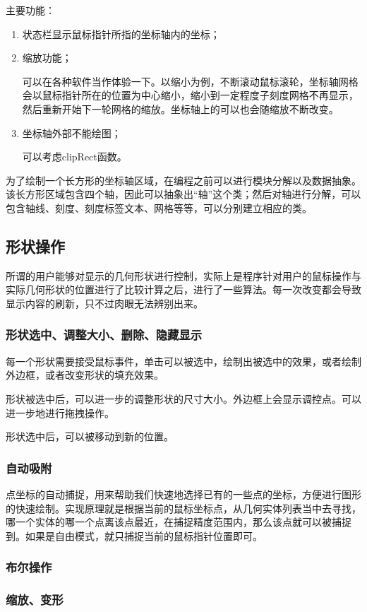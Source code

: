 主要功能：
\begin{enumerate}
	\item 状态栏显示鼠标指针所指的坐标轴内的坐标；
	\item 缩放功能；
	
\hspace*{2em} 可以在各种软件当作体验一下。以缩小为例，不断滚动鼠标滚轮，坐标轴网格会以鼠标指针所在的位置为中心缩小，缩小到一定程度子刻度网格不再显示，然后重新开始下一轮网格的缩放。坐标轴上的可以也会随缩放不断改变。
	\item 坐标轴外部不能绘图；

\hspace*{2em} 可以考虑clipRect函数。
\end{enumerate}

为了绘制一个长方形的坐标轴区域，在编程之前可以进行模块分解以及数据抽象。该长方形区域包含四个轴，因此可以抽象出“轴”这个类；然后对轴进行分解，可以包含轴线、刻度、刻度标签文本、网格等等，可以分别建立相应的类。
\subsection{形状操作}
所谓的用户能够对显示的几何形状进行控制，实际上是程序针对用户的鼠标操作与实际几何形状的位置进行了比较计算之后，进行了一些算法。每一次改变都会导致显示内容的刷新，只不过肉眼无法辨别出来。
\subsubsection{形状选中、调整大小、删除、隐藏显示}
每一个形状需要接受鼠标事件，单击可以被选中，绘制出被选中的效果，或者绘制外边框，或者改变形状的填充效果。

形状被选中后，可以进一步的调整形状的尺寸大小。外边框上会显示调控点。可以进一步地进行拖拽操作。

形状选中后，可以被移动到新的位置。
\subsubsection{自动吸附}
点坐标的自动捕捉，用来帮助我们快速地选择已有的一些点的坐标，方便进行图形的快速绘制。实现原理就是根据当前的鼠标坐标点，从几何实体列表当中去寻找，哪一个实体的哪一个点离该点最近，在捕捉精度范围内，那么该点就可以被捕捉到。如果是自由模式，就只捕捉当前的鼠标指针位置即可。
\subsubsection{布尔操作}

\subsubsection{缩放、变形}

